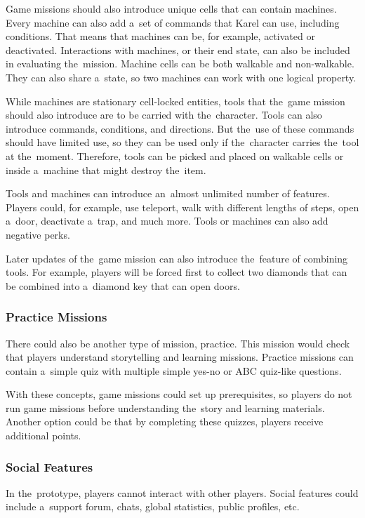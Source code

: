 Game missions should also introduce unique cells that can contain machines.
Every machine can also add a~set of commands that Karel can use, including conditions.
That means that machines can be, for example, activated or deactivated.
Interactions with machines, or their end state, can also be included in evaluating the~mission.
Machine cells can be both walkable and non-walkable.
They can also share a~state, so two machines can work with one logical property.

While machines are stationary cell-locked entities, tools that the~game mission should also introduce are to be carried with the~character.
Tools can also introduce commands, conditions, and directions.
But the~use of these commands should have limited use, so they can be used only if the~character carries the~tool at the~moment.  
Therefore, tools can be picked and placed on walkable cells or inside a~machine that might destroy the~item.

Tools and machines can introduce an~almost unlimited number of features.
Players could, for example, use teleport, walk with different lengths of steps, open a~door, deactivate a~trap, and much more.
Tools or machines can also add negative perks.

Later updates of the~game mission can also introduce the~feature of combining tools.
For example, players will be forced first to collect two diamonds that can be combined into a~diamond key that can open doors.

\subsubsection{Practice Missions}

There could also be another type of mission, practice.
This mission would check that players understand storytelling and learning missions.
Practice missions can contain a~simple quiz with multiple simple yes-no or ABC quiz-like questions.

With these concepts, game missions could set up prerequisites, so players do not run game missions before understanding the~story and learning materials.
Another option could be that by completing these quizzes, players receive additional points.

\subsubsection{Social Features}

In the~prototype, players cannot interact with other players.
Social features could include a~support forum, chats, global statistics, public profiles, etc.

